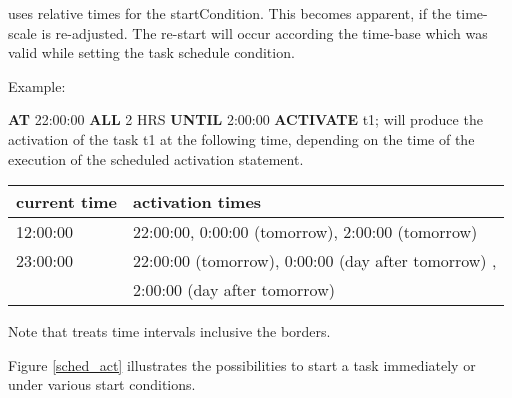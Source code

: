 \begin{added}
\OpenPEARL{} uses relative times for the startCondition. This becomes apparent,
if the time-scale is re-adjusted. The re-start will occur according the
time-base which was valid while setting the task schedule condition.

Example:

{\bf AT} 22:00:00 {\bf ALL} 2 HRS {\bf UNTIL} 2:00:00  {\bf ACTIVATE} t1;
will produce the activation of the task t1 at the following time, 
depending on the time of the execution of the scheduled activation statement.
\begin{tabular}{l|l}
current time & activation times \\
\hline
12:00:00 & 22:00:00, 0:00:00 (tomorrow), 2:00:00 (tomorrow) \\
23:00:00 & 22:00:00 (tomorrow), 0:00:00 (day after tomorrow) ,\\
  &  2:00:00 (day after tomorrow) \\ 
\end{tabular}

Note that \OpenPEARL{} treats time intervals inclusive the borders.

Figure \ref{sched_act} illustrates the possibilities to start a task
immediately or under various start conditions.
\end{added}

